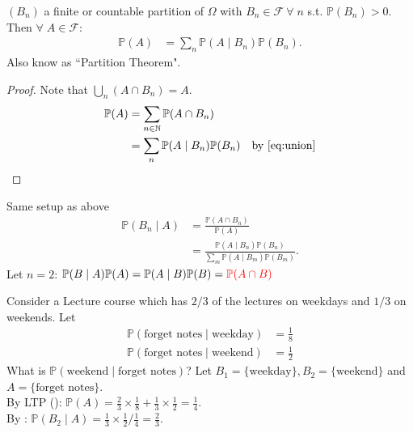 \begin{theorem} \label{thm:ltp}
    $(B_n)$ a finite or countable partition of $\Omega$ with $B_n \in \mathcal{F} \ \forall \; n$ s.t. $\mathbb{P}(B_n) > 0$.
    Then $\forall \; A \in \mathcal{F}$:
    \begin{align*}
        \mathbb{P}(A) &= \sum_n \mathbb{P}(A \mid B_n) \mathbb{P}(B_n).
    \end{align*}  
    Also know as ``Partition Theorem".
\end{theorem} 

\begin{proof}
    Note that $\bigcup_n \left(A \cap B_n \right) = A$.
    \begin{align*}
        \mathbb{P}(A) &= \sum_{n \in \mathbb{N}} \mathbb{P}(A \cap B_n) \\
        &= \sum_n \mathbb{P}(A \mid B_n) \mathbb{P}(B_n) \quad \text{by \Cref{eq:union}}
    \end{align*} 
\end{proof} 

\begin{theorem} \label{thm:bayes}
    Same setup as above
    \begin{align*}
        \mathbb{P}(B_n \mid A) &= \frac{\mathbb{P}(A \cap B_n)}{\mathbb{P}(A)} \\
        &= \frac{\mathbb{P}(A \mid B_n) \mathbb{P}(B_n)}{\sum_m \mathbb{P}(A \mid B_m) \mathbb{P}(B_m)}.
    \end{align*} 
    Let $n = 2$: $\mathbb{P}(B \mid A) \mathbb{P}(A) = \mathbb{P}(A \mid B) \mathbb{P}(B) = \mathcolor{red}{\mathbb{P}(A \cap B)}$
\end{theorem} 

\begin{example}
    Consider a Lecture course which has $2 / 3$ of the lectures on weekdays and $1 / 3$ on weekends.
    Let 
    \begin{align*}
        \mathbb{P}(\text{forget notes} \mid \text{weekday}) &= \frac{1}{8} \\
        \mathbb{P}(\text{forget notes} \mid \text{weekend}) &= \frac{1}{2}
    \end{align*} 
    What is $\mathbb{P}(\text{weekend} \mid \text{forget notes})$?
    Let $B_1 = \{\text{weekday}\}, B_2 = \{ \text{weekend} \}$ and $A = \{\text{forget notes}\}$. \\
    By LTP (): $\mathbb{P}(A) = \frac{2}{3} \times \frac{1}{8} + \frac{1}{3} \times \frac{1}{2} = \frac{1}{4}$. \\
    By : $\mathbb{P}(B_2 \mid A) = \frac{1}{3} \times \frac{1}{2} / \frac{1}{4} = \frac{2}{3}$.
\end{example}

